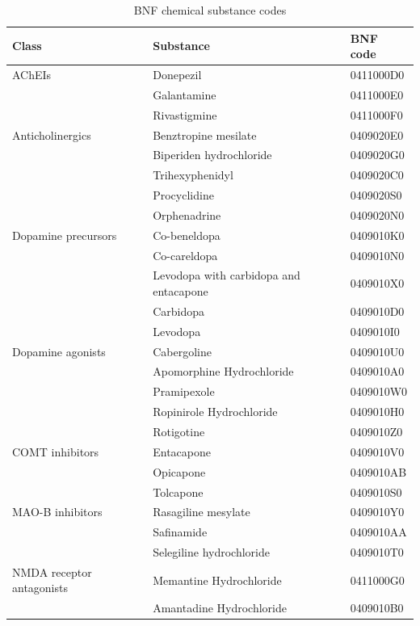\begin{table}[htbp]
\centering
\caption{BNF chemical substance codes}
\label{tab:bnf_codes}
\footnotesize
\begin{tabular}{lll}
\toprule
Class & Substance & BNF code \\
\midrule
AChEIs & Donepezil & 0411000D0 \\
 & Galantamine & 0411000E0 \\
 & Rivastigmine & 0411000F0 \\
\midrule
Anticholinergics & Benztropine mesilate & 0409020E0 \\
 & Biperiden hydrochloride & 0409020G0 \\
 & Trihexyphenidyl & 0409020C0 \\
 & Procyclidine & 0409020S0 \\
 & Orphenadrine & 0409020N0 \\
\midrule
Dopamine precursors & Co-beneldopa & 0409010K0 \\
 & Co-careldopa & 0409010N0 \\
 & Levodopa with carbidopa and entacapone & 0409010X0 \\
 & Carbidopa & 0409010D0 \\
 & Levodopa & 0409010I0 \\
\midrule
Dopamine agonists & Cabergoline & 0409010U0 \\
 & Apomorphine Hydrochloride & 0409010A0 \\
 & Pramipexole & 0409010W0 \\
 & Ropinirole Hydrochloride & 0409010H0 \\
 & Rotigotine & 0409010Z0 \\
\midrule
COMT inhibitors & Entacapone & 0409010V0 \\
 & Opicapone & 0409010AB \\
 & Tolcapone & 0409010S0 \\
\midrule
MAO-B inhibitors & Rasagiline mesylate & 0409010Y0 \\
 & Safinamide & 0409010AA \\
 & Selegiline hydrochloride & 0409010T0 \\
\midrule
NMDA receptor antagonists & Memantine Hydrochloride & 0411000G0 \\
 & Amantadine Hydrochloride & 0409010B0 \\
\bottomrule
\end{tabular}
\end{table}
